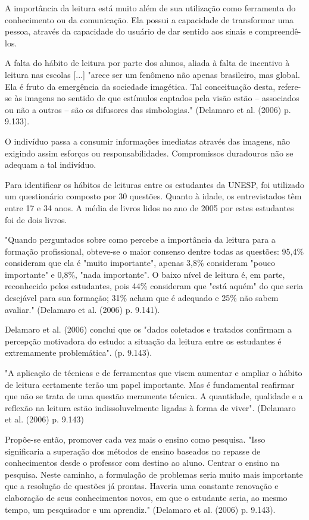 \documentclass[
	article,			%
	11pt,				%
	oneside,			%
	a4paper,			%
	english,			%
	brazil,				%
	sumario=tradicional
	]{abntex2}
\begin{document}
A importância da leitura está muito além de sua utilização como ferramenta do conhecimento ou da comunicação. Ela possui a capacidade de transformar uma pessoa, através da capacidade do usuário de dar sentido aos sinais e compreendê-los.

A falta do hábito de leitura por parte dos alunos, aliada à falta de incentivo à leitura nas escolas [...] "arece ser um fenômeno não apenas brasileiro, mas global. Ela é fruto da emergência da sociedade imagética. Tal conceituação desta, refere-se às imagens no sentido de que estímulos captados pela visão estão – associados ou não a outros – são os difusores das simbologias." (Delamaro et al. (2006) p. 9.133). 	

O indivíduo passa a consumir informações imediatas através das imagens, não exigindo assim esforços ou responsabilidades. Compromissos duradouros não se adequam a tal indivíduo.

Para identificar os hábitos de leituras entre os estudantes da UNESP, foi utilizado um questionário composto por 30 questões.
Quanto à idade, os entrevistados têm entre 17 e 34 anos. A média de livros lidos no ano de 2005 por estes estudantes foi de dois livros. 

"Quando perguntados sobre como percebe a importância da leitura para a formação profissional, obteve-se o maior consenso dentre todas as questões: 95,4\% consideram que ela é "muito importante", apenas 3,8\% consideram "pouco importante" e 0,8\%, "nada importante". O baixo nível de leitura é, em parte, reconhecido pelos estudantes, pois 44\% consideram que "está aquém" do que seria desejável para sua formação; 31\% acham que é adequado e 25\% não sabem avaliar." (Delamaro et al. (2006) p. 9.141).

Delamaro et al. (2006) conclui que os "dados coletados e tratados confirmam a percepção motivadora do estudo: a situação da leitura entre os estudantes é extremamente problemática". (p. 9.143).

"A aplicação de técnicas e de ferramentas que visem aumentar e ampliar o hábito de leitura certamente terão um papel importante. Mas é fundamental reafirmar que não se trata de uma questão meramente técnica. A quantidade, qualidade e a reflexão na leitura estão indissoluvelmente ligadas à forma de viver". (Delamaro et al. (2006) p. 9.143)

Propõe-se então, promover cada vez mais o ensino como pesquisa. "Isso significaria a superação dos métodos de ensino baseados no repasse de conhecimentos desde o professor com destino ao aluno. Centrar o ensino na pesquisa. Neste caminho, a formulação de problemas seria muito mais importante que a resolução de questões já prontas. Haveria uma constante renovação e elaboração de seus conhecimentos novos, em que o estudante seria, ao mesmo tempo, um pesquisador e um aprendiz." (Delamaro et al. (2006) p. 9.143).
\end{document}

